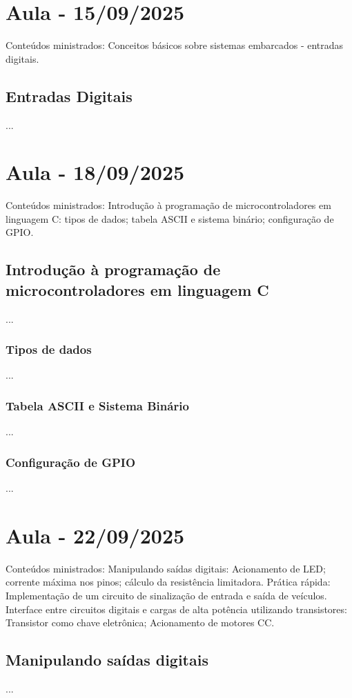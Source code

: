 \documentclass{article}
\begin{document}
\section{Aula - 15/09/2025}
Conteúdos ministrados:  Conceitos básicos sobre sistemas embarcados - entradas digitais. 

\subsection{Entradas Digitais}
...

\section{Aula - 18/09/2025}
Conteúdos ministrados:  Introdução à programação de microcontroladores em linguagem C: tipos de dados; tabela ASCII e sistema binário; configuração de GPIO.

\subsection{Introdução à programação de microcontroladores em linguagem C}
...

\subsubsection{Tipos de dados} 
...

\subsubsection{Tabela ASCII e Sistema Binário}
...

\subsubsection{Configuração de GPIO}
...

\section{Aula - 22/09/2025}
Conteúdos ministrados:  Manipulando saídas digitais: Acionamento de LED; corrente máxima nos pinos; cálculo da resistência limitadora. Prática rápida: Implementação de um circuito de sinalização de entrada e saída de veículos. Interface entre circuitos digitais e cargas de alta potência utilizando transistores: Transistor como chave eletrônica; Acionamento de motores CC. 

\subsection{Manipulando saídas digitais}
...
\end{document}
